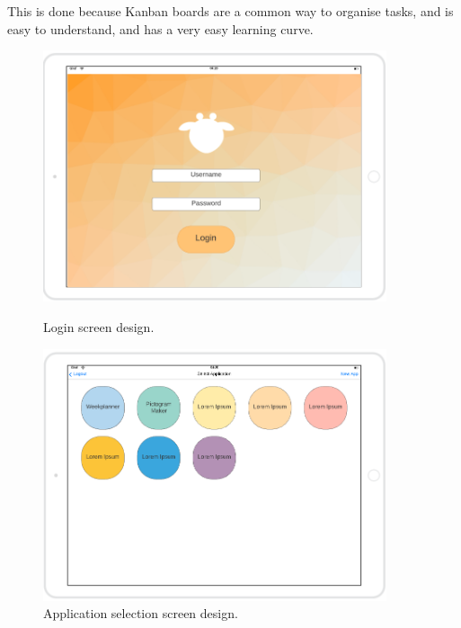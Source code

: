 This is done because Kanban boards are a common way to organise tasks, and is easy to understand, and has a very easy learning curve. \cite{kanbanBoard}

\begin{figure}[H]
    \centering
    \begin{minipage}{0.45\textwidth}
        \centering
        \includegraphics[width=0.9\textwidth]{Sprint_1/images/login_screen.png}
        \caption{Login screen design.}
        \label{login_screen_design}
    \end{minipage}\hfill
    \begin{minipage}{0.45\textwidth}
        \centering
        \includegraphics[width=0.9\textwidth]{Sprint_1/images/app_selection_screen.png}
        \caption{Application selection screen design.}
        \label{app_selection_screen}
    \end{minipage}
\end{figure}

